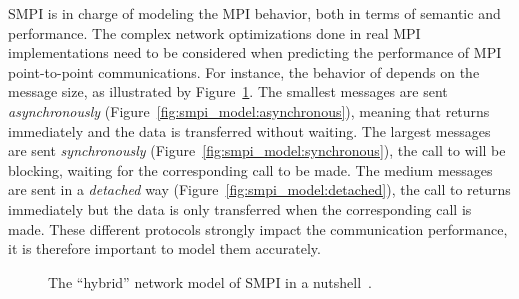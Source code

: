         SMPI is in charge of modeling the MPI behavior, both in terms of semantic and performance. The complex network
        optimizations done in real MPI implementations need to be considered when predicting the performance of MPI
        point-to-point communications. For instance, the behavior of \send depends on the message size, as illustrated
        by Figure~\ref{fig:smpi_model}. The smallest messages are sent \emph{asynchronously}
        (Figure~\ref{fig:smpi_model:asynchronous}), meaning that \send returns immediately and the data is transferred
        without waiting. The largest messages are sent \emph{synchronously} (Figure~\ref{fig:smpi_model:synchronous}),
        \ie the call to \send will be blocking, waiting for the corresponding \recv call to be made. The medium messages
        are sent in a \emph{detached} way (Figure~\ref{fig:smpi_model:detached}), the call to \send returns immediately
        but the data is only transferred when the corresponding \recv call is made.  These different protocols strongly
        impact the communication performance, it is therefore important to model them accurately.

        \begin{figure}[htpb]
            \centering
            \caption{The ``hybrid'' network model of SMPI in a nutshell~\cite{smpi}.}%
            \label{fig:smpi_model}
        \end{figure}


